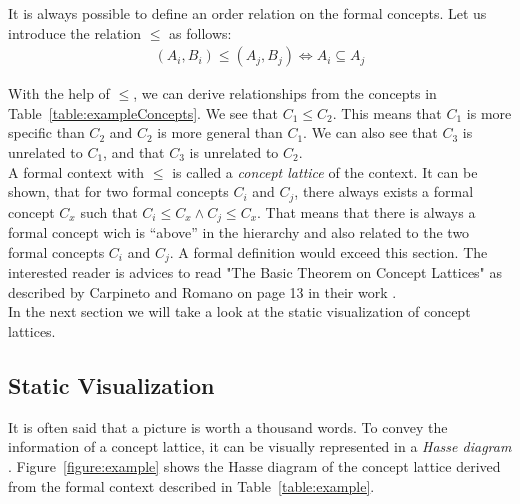\documentclass[11pt]{report}
\begin{document}
It is always possible to define an order relation on the formal concepts. Let us introduce the relation $\le$ as follows:
\begin{align*} (A_i,B_i) \le (A_j, B_j) \Longleftrightarrow	A_i \subseteq A_j
\end{align*}

With the help of $\le$, we  can derive relationships from the concepts in Table~\ref{table:exampleConcepts}. We see that $C_1 \le C_2$. This means that $C_1$ is more specific than $C_2$ and $C_2$ is more general than $C_1$. We can also see that $C_3$ is unrelated to $C_1$, and that $C_3$ is unrelated to $C_2$. \\

A formal context with $\le$ is called a \textit{concept lattice} of the context. It can be shown, that for two formal concepts $C_i$ and $C_j$, there always exists a formal concept $C_x$ such that $C_i \le C_x \wedge C_j \le C_x$. That means that there is always a formal concept wich is ``above'' in the hierarchy and also related to the two formal concepts $C_i$ and $C_j$. A formal definition would exceed this section. The interested reader is advices to read "The Basic Theorem on Concept Lattices" as described by Carpineto and Romano on page 13 in their work \cite{carpineto2004concept}.\\

In the next section we will take a look at the static visualization of concept lattices.

\subsection{Static Visualization}

It is often said that a picture is worth a thousand words. To convey the information of a concept lattice, it can be visually represented in a \textit{Hasse diagram} \cite{Ganter2012}. Figure~\ref{figure:example} shows the Hasse diagram of the concept lattice derived from the formal context described in Table~\ref{table:example}. \\
\end{document}
